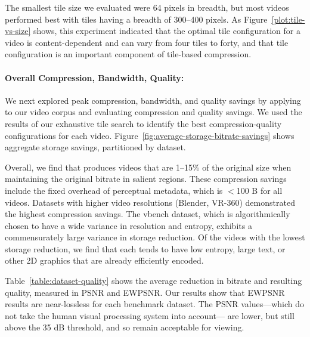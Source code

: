 \tileVsSizeFigure

The smallest tile size we evaluated were 64 pixels in breadth, but most videos performed best with tiles having a breadth of 300--400 pixels.
As Figure~\ref{plot:tile-vs-size} shows, this experiment indicated that the optimal tile configuration for a video is content-dependent and can vary from four tiles to forty, and that tile configuration is an important component of tile-based compression.


\paragraph{Overall Compression, Bandwidth, Quality: }We next explored peak compression, bandwidth, and quality savings by applying \name to our video corpus and evaluating compression and quality savings.
We used the results of our exhaustive tile search to identify the best compression-quality configurations for each video.
Figure~\ref{fig:average-storage-bitrate-savings} shows aggregate storage savings, partitioned by  dataset.

\avgStorageBitrateSavings

Overall, we find that \nameCompress produces videos that are 1--15\% of the original size when maintaining the original bitrate in salient regions.
These compression savings include the fixed overhead of perceptual metadata, which is $<$100 B for all videos.
Datasets with higher video resolutions (Blender, VR-360) demonstrated the highest compression savings.
The vbench dataset, which is algorithmically chosen to have a wide variance in resolution and entropy, exhibits a commensurately large variance in storage reduction.
Of the videos with the lowest storage reduction, we find that each tends to have low entropy, large text, or other 2D graphics that are already efficiently encoded.


Table~\ref{table:dataset-quality} shows the average reduction in bitrate and resulting quality, measured in PSNR and EWPSNR.
Our results show that EWPSNR results are near-lossless for each benchmark dataset.
The PSNR values---which do not take the human visual processing system into account--- are lower, but still above the 35 dB threshold, and so remain acceptable for viewing.

